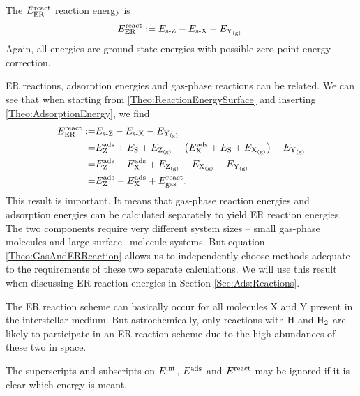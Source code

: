 \documentclass[8.5pt,twoside,twocolumn]{article}
\newcommand\eint{\enmat{E^{\te{int}}}}
\newcommand\eads{\enmat{E^{\te{ads}}}}
\newcommand\ere{\enmat{E^{\te{react}}}}
\newcommand\sur{\enmat{\te{s-}}}
\newcommand\gas{\enmat{_\te{(g)}}}
\theoremstyle{standard}
\begin{document}
The $\ere_{\te{ER}}$ reaction energy is
\begin{equation}
 \ere_{\te{ER}}:= E_{\sur\Z} - E_{\sur\X} - E_{\Y\gas}.
 \label{Theo:ReactionEnergySurface}
\end{equation}
Again, all energies are ground-state energies with possible zero-point energy
correction.

ER reactions, adsorption energies and gas-phase reactions can be related. We can see
that when starting from \eqref{Theo:ReactionEnergySurface} and inserting
\eqref{Theo:AdsorptionEnergy}, we find
\begin{equation}
 \begin{aligned}
   \ere_{\te{ER}}:=& E_{\sur\Z} - E_{\sur\X} - E_{\Y\gas}\\
   =& \eads_{\Z}+E_\S + E_{\Z\gas} - \rb{\eads_{\X} +E_\S + E_{\X\gas}} - E_{\Y\gas}\\
   =& \eads_{\Z}-\eads_{\X} + E_{\Z\gas} - E_{\X\gas} - E_{\Y\gas}\\
   =& \eads_{\Z}-\eads_{\X} + \ere_{\te{gas}}.
 \end{aligned}
 \label{Theo:GasAndERReaction}
\end{equation}
This result is important. It means that gas-phase reaction energies and
adsorption energies can be calculated separately to yield ER reaction energies.
The two components require very different system sizes -- small gas-phase
molecules and large surface+molecule systems. But equation
\eqref{Theo:GasAndERReaction} allows us to independently choose methods
adequate to the requirements of these two separate calculations.
We will use this result when discussing ER reaction energies in Section
\ref{Sec:Ads:Reactions}.

The ER reaction scheme can basically occur for all molecules X and Y present in
the interstellar medium. But astrochemically, only reactions with H and $\text H_2$
are likely to participate in an ER reaction scheme due to the high
abundances of these two in space.

The superscripts and subscripts on $\eint$, $\eads$ and $\ere$ may be ignored
if it is clear which energy is meant.
\end{document}
